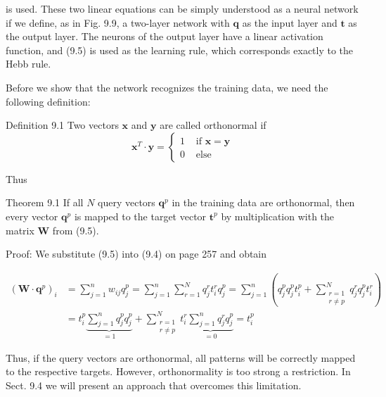\documentclass[10pt]{book}
\begin{document}
is used. These two linear equations can be simply understood as a neural network if we define, as in Fig. 9.9, a two-layer network with $\boldsymbol{q}$ as the input layer and $\boldsymbol{t}$ as the output layer. The neurons of the output layer have a linear activation function, and (9.5) is used as the learning rule, which corresponds exactly to the Hebb rule.

Before we show that the network recognizes the training data, we need the following definition:

Definition 9.1 Two vectors $\boldsymbol{x}$ and $\boldsymbol{y}$ are called orthonormal if
$$
\boldsymbol{x}^{T} \cdot \boldsymbol{y}= \begin{cases}1 & \text { if } \boldsymbol{x}=\boldsymbol{y} \\ 0 & \text { else }\end{cases}
$$

Thus

Theorem 9.1 If all $N$ query vectors $\boldsymbol{q}^{p}$ in the training data are orthonormal, then every vector $\boldsymbol{q}^{p}$ is mapped to the target vector $\boldsymbol{t}^{p}$ by multiplication with the matrix $\boldsymbol{W}$ from (9.5).

Proof: We substitute (9.5) into (9.4) on page 257 and obtain

$$
\begin{aligned}
\left(\boldsymbol{W} \cdot \boldsymbol{q}^{p}\right)_{i} & =\sum_{j=1}^{n} w_{i j} q_{j}^{p}=\sum_{j=1}^{n} \sum_{r=1}^{N} q_{j}^{r} t_{i}^{r} q_{j}^{p}=\sum_{j=1}^{n}\left(q_{j}^{p} q_{j}^{p} t_{i}^{p}+\sum_{\substack{r=1 \\
r \neq p}}^{N} q_{j}^{r} q_{j}^{p} t_{i}^{r}\right) \\
& =t_{i}^{p} \underbrace{\sum_{j=1}^{n} q_{j}^{p} q_{j}^{p}}_{=1}+\sum_{\substack{r=1 \\
r \neq p}}^{N} t_{i}^{r} \underbrace{\sum_{j=1}^{n} q_{j}^{r} q_{j}^{p}}_{=0}=t_{i}^{p}
\end{aligned}
$$

Thus, if the query vectors are orthonormal, all patterns will be correctly mapped to the respective targets. However, orthonormality is too strong a restriction. In Sect. 9.4 we will present an approach that overcomes this limitation.
\end{document}
